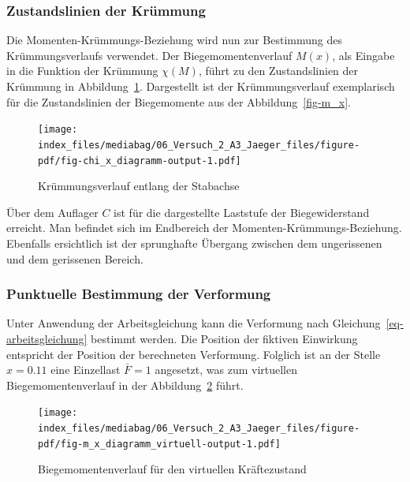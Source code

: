 \documentclass[
  12pt,
  letterpaper,
  egregdoesnotlikesansseriftitles]{scrreprt}
\begin{document}
\hypertarget{zustandslinien-der-kruxfcmmung}{%
\subsubsection{Zustandslinien der
Krümmung}\label{zustandslinien-der-kruxfcmmung}}

Die Momenten-Krümmungs-Beziehung wird nun zur Bestimmung des
Krümmungsverlaufs verwendet. Der Biegemomentenverlauf \(M(x)\), als
Eingabe in die Funktion der Krümmung \(\chi(M)\), führt zu den
Zustandslinien der Krümmung in Abbildung~\ref{fig-chi_x_diagramm}.
Dargestellt ist der Krümmungsverlauf exemplarisch für die Zustandslinien
der Biegemomente aus der Abbildung~\ref{fig-m_x}.

\begin{figure}[H]

{\centering \texttt{[image: index\_files/mediabag/06\_Versuch\_2\_A3\_Jaeger\_files/figure-pdf/fig-chi\_x\_diagramm-output-1.pdf]}

}

\caption{\label{fig-chi_x_diagramm}Krümmungsverlauf entlang der
Stabachse}

\end{figure}

Über dem Auflager \(C\) ist für die dargestellte Laststufe der
Biegewiderstand erreicht. Man befindet sich im Endbereich der
Momenten-Krümmungs-Beziehung. Ebenfalls ersichtlich ist der sprunghafte
Übergang zwischen dem ungerissenen und dem gerissenen Bereich.

\hypertarget{punktuelle-bestimmung-der-verformung}{%
\subsubsection{Punktuelle Bestimmung der
Verformung}\label{punktuelle-bestimmung-der-verformung}}

Unter Anwendung der Arbeitsgleichung kann die Verformung nach
Gleichung~\ref{eq-arbeitsgleichung} bestimmt werden. Die Position der
fiktiven Einwirkung entspricht der Position der berechneten Verformung.
Folglich ist an der Stelle \(x=0.11\) eine Einzellast \(\bar{F} = 1\)
angesetzt, was zum virtuellen Biegemomentenverlauf in der
Abbildung~\ref{fig-m_x_diagramm_virtuell} führt.

\begin{figure}[H]

{\centering \texttt{[image: index\_files/mediabag/06\_Versuch\_2\_A3\_Jaeger\_files/figure-pdf/fig-m\_x\_diagramm\_virtuell-output-1.pdf]}

}

\caption{\label{fig-m_x_diagramm_virtuell}Biegemomentenverlauf für den
virtuellen Kräftezustand}

\end{figure}
\end{document}
